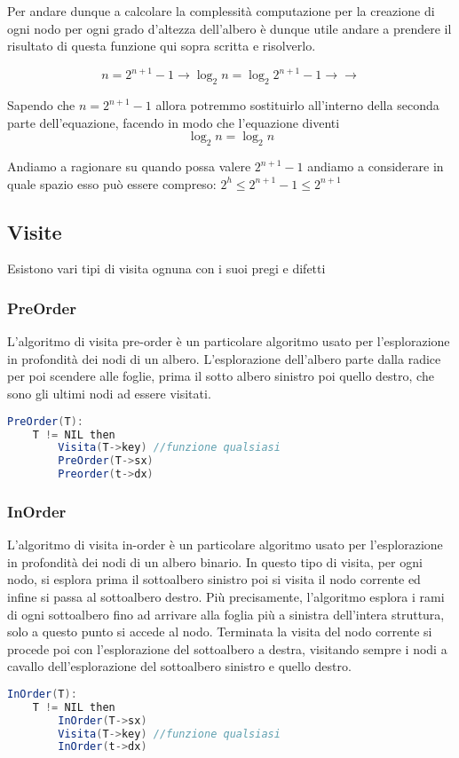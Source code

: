 Per andare dunque a calcolare la complessità computazione per la creazione di ogni nodo per ogni grado d'altezza dell'albero è dunque utile andare a prendere il risultato di questa funzione qui sopra scritta e risolverlo.

$$n=2^{n+1}-1 \rightarrow \log_{2}n = \log_{2}2^{n+1}-1 \rightarrow \rightarrow$$

Sapendo che $n = 2^{n+1}-1$ allora potremmo sostituirlo all'interno della seconda parte dell'equazione, facendo in modo che l'equazione diventi
$$\log_{2}n = \log_{2}n $$

Andiamo a ragionare su quando possa valere $2^{n+1}-1$ andiamo a considerare in quale spazio esso può essere compreso:
$2^h\le 2^{n+1}-1\le 2^{n+1}$


 
\subsection{Visite}
Esistono vari tipi di visita ognuna con i suoi pregi e difetti
\subsubsection{PreOrder}
L'algoritmo di visita pre-order è un particolare algoritmo usato per l'esplorazione in profondità dei nodi di un albero. L'esplorazione dell'albero parte dalla radice per poi scendere alle foglie, prima il sotto albero sinistro poi quello destro, che sono gli ultimi nodi ad essere visitati.
\begin{lstlisting}[language=Java]
PreOrder(T):
	T != NIL then
		Visita(T->key) //funzione qualsiasi
		PreOrder(T->sx)
		Preorder(t->dx)	
\end{lstlisting}
\subsubsection{InOrder}
L'algoritmo di visita in-order è un particolare algoritmo usato per l'esplorazione in profondità dei nodi di un albero binario. In questo tipo di visita, per ogni nodo, si esplora prima il sottoalbero sinistro poi si visita il nodo corrente ed infine si passa al sottoalbero destro. Più precisamente, l'algoritmo esplora i rami di ogni sottoalbero fino ad arrivare alla foglia più a sinistra dell'intera struttura, solo a questo punto si accede al nodo. Terminata la visita del nodo corrente si procede poi con l'esplorazione del sottoalbero a destra, visitando sempre i nodi a cavallo dell'esplorazione del sottoalbero sinistro e quello destro. 
\begin{lstlisting}[language=Java]
InOrder(T):
	T != NIL then
		InOrder(T->sx)
		Visita(T->key) //funzione qualsiasi
		InOrder(t->dx)	
\end{lstlisting}

